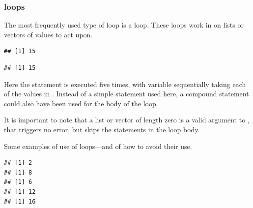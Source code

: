 \documentclass[krantz2]{krantz}\usepackage{knitr}
\begin{document}
\subsubsection[\texttt{for} loops]{ loops}
The most frequently used type of loop is a  loop. These loops work in \Rlang on lists or vectors of values to act upon.

\begin{knitrout}\footnotesize
{}\color{fgcolor}\begin{kframe}
\begin{alltt}
 \hlkwb{<-} 
   \hlopt{:} \hlkwb{<-}  \hlopt{+} 
\end{alltt}
\begin{verbatim}
## [1] 15
\end{verbatim}
\begin{alltt}
 \hlkwb{<-} \hlstd{(}\hlopt{:}\hlstd{)} 
\end{alltt}
\begin{verbatim}
## [1] 15
\end{verbatim}
\end{kframe}
\end{knitrout}

Here the statement  is executed five times, with variable  sequentially taking each of the values in . Instead of a simple statement used here, a compound statement could also have been used for the body of the  loop.

\begin{warningbox}
It is important to note that a list or vector of length zero is a valid argument to , that triggers no error, but skips the statements in the loop body.
\end{warningbox}

Some examples of use of  loops---and of how to avoid their use.

\begin{knitrout}\footnotesize
{}\color{fgcolor}\begin{kframe}
\begin{alltt}
 \hlkwb{<-} \hlstd{(}\hlstd{,} \hlstd{,} \hlstd{,} \hlstd{,} \hlstd{)}
  \hlopt{*}\hlstd{)\}} 
\end{alltt}
\begin{verbatim}
## [1] 2
## [1] 8
## [1] 6
## [1] 12
## [1] 16
\end{verbatim}
\end{kframe}
\end{knitrout}
\end{document}
